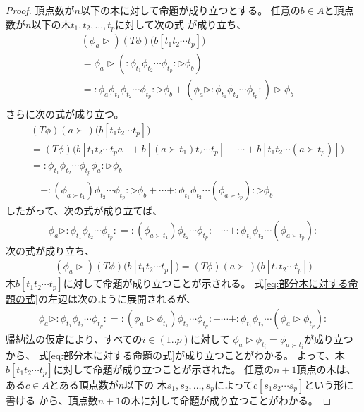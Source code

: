 \begin{proof}
頂点数が$n$以下の木に対して命題が成り立つとする。
任意の$b\in A$と頂点数が$n$以下の木$t_1,t_2,\dots,t_p$に対して次の式
が成り立ち、
\begin{equation*}\begin{split} %
	&(\phi_a\rhd)(T\phi)\bigl(b[t_1t_2\cdots t_p]\bigr) \\
	&= \phi_a\rhd
		(:\phi_{t_1}\phi_{t_2}\cdots\phi_{t_p}:\rhd\phi_b) \\
	&= :\phi_a\phi_{t_1}\phi_{t_2}\cdots\phi_{t_p}:\rhd\phi_b
		+ (\phi_a\rhd:\phi_{t_1}\phi_{t_2}\cdots\phi_{t_p}:)\rhd\phi_b \\
\end{split}\end{equation*} %
さらに次の式が成り立つ。
\begin{equation*}\begin{split} %
	&(T\phi)(a\succ)\bigl(b[t_1t_2\cdots t_p]\bigr) \\
	&= (T\phi)\bigl(b[t_1t_2\cdots t_pa]
		+ b[(a\succ t_1)t_2\cdots t_p]
		+ \cdots + b[t_1t_2\cdots (a\succ t_p)]\bigr) \\
	&= :\phi_{t_1}\phi_{t_2}\cdots\phi_{t_p}\phi_a:\rhd\phi_b \\
	&\quad + :(\phi_{a\succ t_1})\phi_{t_2}\cdots\phi_{t_p}:\rhd\phi_b
		+ \cdots + :\phi_{t_1}\phi_{t_2}\cdots(\phi_{a\succ t_p}):\rhd\phi_b
\end{split}\end{equation*} %
したがって、次の式が成り立てば、
\begin{equation}\label{eq:部分木に対する命題の式}\begin{split} %
	\phi_a\rhd:\phi_{t_1}\phi_{t_2}\cdots\phi_{t_p}:
	= :(\phi_{a\succ t_1})\phi_{t_2}\cdots\phi_{t_p}:
	+ \cdots + :\phi_{t_1}\phi_{t_2}\cdots(\phi_{a\succ t_p}):
\end{split}\end{equation} %
次の式が成り立ち、
\begin{equation*}\begin{split} %
	(\phi_a\rhd)(T\phi)\bigl(b[t_1t_2\cdots t_p]\bigr)
	= (T\phi)(a\succ)\bigl(b[t_1t_2\cdots t_p]\bigr)
\end{split}\end{equation*} %
木$b[t_1t_2\cdots t_p]$に対して命題が成り立つことが示される。
式\eqref{eq:部分木に対する命題の式}の左辺は次のように展開されるが、
\begin{equation*}\begin{split} %
	\phi_a\rhd:\phi_{t_1}\phi_{t_2}\cdots\phi_{t_p}:
	= :(\phi_a\rhd\phi_{t_1})\phi_{t_2}\cdots\phi_{t_p}:
	+ \cdots + :\phi_{t_1}\phi_{t_2}\cdots(\phi_a\rhd\phi_{t_p}):
\end{split}\end{equation*} %
帰納法の仮定により、すべての$i\in(1..p)$に対して
$\phi_a\rhd\phi_{t_i}=\phi_{a\succ t_i}$が成り立つから、
式\eqref{eq:部分木に対する命題の式}が成り立つことがわかる。
よって、木$b[t_1t_2\cdots t_p]$に対して命題が成り立つことが示された。
任意の$n+1$頂点の木は、ある$c\in A$とある頂点数が$n$以下の
木$s_1,s_2,\dots,s_p$によって$c[s_1s_2\cdots s_p]$という形に書ける
から、頂点数$n+1$の木に対して命題が成り立つことがわかる。
\end{proof} %

